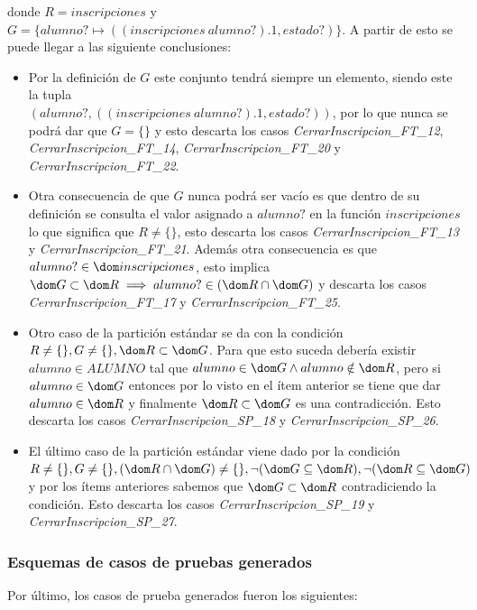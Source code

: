 \documentclass{article}
\begin{document}
donde $R = inscripciones$ y $G = \{alumno? \mapsto ((inscripciones~alumno?).1, estado?)\}$. A partir de esto se puede llegar a las siguiente conclusiones:
\begin{itemize}
    \item Por la definición de $G$ este conjunto tendrá siempre un elemento, siendo este la tupla \\ $(alumno?, ((inscripciones~alumno?).1, estado?))$, por lo que nunca se podrá dar que $G = \{\}$ y esto descarta los casos \emph{CerrarInscripcion\_FT\_12}, \emph{CerrarInscripcion\_FT\_14}, \emph{CerrarInscripcion\_FT\_20} y \emph{CerrarInscripcion\_FT\_22}.
    \item Otra consecuencia de que $G$ nunca podrá ser vacío es que dentro de su definición se consulta el valor asignado a $alumno?$ en la función $inscripciones$ lo que significa que $R \neq \{\}$, esto descarta los casos  \emph{CerrarInscripcion\_FT\_13} y \emph{CerrarInscripcion\_FT\_21}. Además otra consecuencia es que $alumno? \in \dom inscripciones$, esto implica $\dom G \subset \dom R \implies alumno? \in (\dom R \cap \dom G)$ y descarta los casos \emph{CerrarInscripcion\_FT\_17} y \emph{CerrarInscripcion\_FT\_25}.
    \item Otro caso de la partición estándar se da con la condición $R \neq \{\}, G \neq \{\}, \dom R \subset \dom G$. Para que esto suceda debería existir $alumno \in ALUMNO$ tal que $alumno \in \dom G \land alumno \notin \dom R$, pero si $alumno \in \dom G$ entonces por lo visto en el ítem anterior se tiene que dar $alumno \in \dom R$ y finalmente $\dom R \subset \dom G$ es una contradicción. Esto descarta los casos \emph{CerrarInscripcion\_SP\_18} y \emph{CerrarInscripcion\_SP\_26}.
    \item El último caso de la partición estándar viene dado por la condición $R \neq \{\}, G \neq \{\}, (\dom R \cap \dom G) \neq \{\}, \neg (\dom G \subseteq \dom R), \neg (\dom R \subseteq \dom G)$ y por los ítems anteriores sabemos que $\dom G \subset \dom R$ contradiciendo la condición. Esto descarta los casos \emph{CerrarInscripcion\_SP\_19} y \emph{CerrarInscripcion\_SP\_27}.
\end{itemize}

\subsubsection*{Esquemas de casos de pruebas generados}

Por último, los casos de prueba generados fueron los siguientes:
\end{document}
